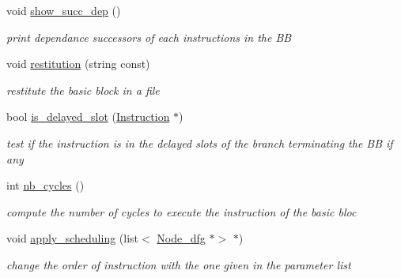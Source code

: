 \begin{DoxyCompactItemize}
\mbox{\label{class_basic__block_a54af30c9090798026462dbd5deb2da88}} 
void \mbox{\hyperlink{class_basic__block_a54af30c9090798026462dbd5deb2da88}{show\+\_\+succ\+\_\+dep}} ()
\begin{DoxyCompactList}\small\item\em print dependance successors of each instructions in the BB \end{DoxyCompactList}\item 
\mbox{\label{class_basic__block_af74c4eeeecfb7a3f3fddbeb2994523a4}} 
void \mbox{\hyperlink{class_basic__block_af74c4eeeecfb7a3f3fddbeb2994523a4}{restitution}} (string const)
\begin{DoxyCompactList}\small\item\em restitute the basic block in a file \end{DoxyCompactList}\item 
\mbox{\label{class_basic__block_ad156275e42428ee703ffa0aa3e8b5bb0}} 
bool \mbox{\hyperlink{class_basic__block_ad156275e42428ee703ffa0aa3e8b5bb0}{is\+\_\+delayed\+\_\+slot}} (\mbox{\hyperlink{class_instruction}{Instruction}} $\ast$)
\begin{DoxyCompactList}\small\item\em test if the instruction is in the delayed slots of the branch terminating the BB if any \end{DoxyCompactList}\item 
\mbox{\label{class_basic__block_a0a9caa9a904adc7807e390308e7b939c}} 
int \mbox{\hyperlink{class_basic__block_a0a9caa9a904adc7807e390308e7b939c}{nb\+\_\+cycles}} ()
\begin{DoxyCompactList}\small\item\em compute the number of cycles to execute the instruction of the basic bloc \end{DoxyCompactList}\item 
\mbox{\label{class_basic__block_ac24f071fb63b6e32f5672fa513809ab5}} 
void \mbox{\hyperlink{class_basic__block_ac24f071fb63b6e32f5672fa513809ab5}{apply\+\_\+scheduling}} (list$<$ \mbox{\hyperlink{class_node__dfg}{Node\+\_\+dfg}} $\ast$$>$ $\ast$)
\begin{DoxyCompactList}\small\item\em change the order of instruction with the one given in the parameter list \end{DoxyCompactList}\item 
$$
\end{DoxyCompactItemize}
